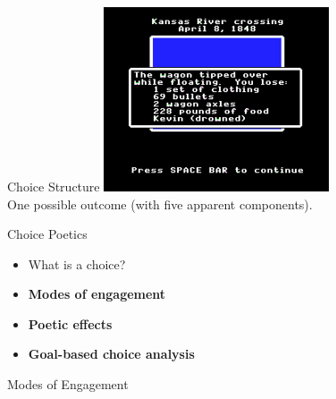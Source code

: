 \documentclass[xcolor=x11names]{beamer}
\begin{document}
\begin{frame}{Choice Structure}
  \centering
  \includegraphics[width=0.5\textwidth]{res/oregon-trail-kansas-river-outcome.png} \\ \vspace{1ex}
  One possible outcome (with five apparent components).
\end{frame}

\begin{frame}{Choice Poetics}
  \begin{itemize}\addtolength{\itemsep}{0.5\baselineskip}
      \item What is a choice?
      \item \textbf{Modes of engagement}
      \item \textbf{Poetic effects}
      \item \textbf{Goal-based choice analysis}
  \end{itemize}
\end{frame}

\begin{frame}{Modes of Engagement}
  \hbox{
  }
\vfill
\tiny
\centering
{} \\
 \\
\end{frame}
\end{document}
